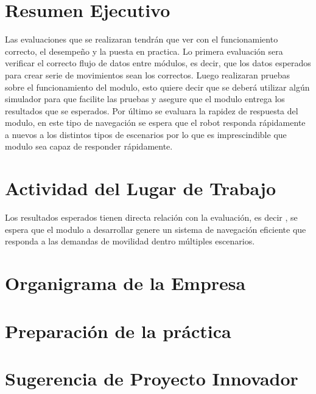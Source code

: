 \documentclass[11pt,twoside]{article}
\begin{document}
\section{Resumen Ejecutivo}

Las evaluaciones que se realizaran tendrán que ver con el funcionamiento correcto, el desempeño y la puesta en practica. Lo primera evaluación sera verificar el correcto flujo de datos entre módulos, es decir, que los datos esperados para crear serie de movimientos sean los correctos. Luego realizaran pruebas sobre el funcionamiento del modulo, esto quiere decir que se deberá utilizar algún simulador para que facilite las pruebas y asegure que el modulo entrega los resultados que se esperados. Por último se evaluara la rapidez de respuesta del modulo, en este tipo de navegación se espera que el robot responda rápidamente a nuevos a los distintos tipos de escenarios por lo que es imprescindible que modulo sea capaz de responder rápidamente.

\section{Actividad del Lugar de Trabajo}
Los resultados esperados tienen directa relación con la evaluación, es decir , se espera que el modulo a desarrollar genere un sistema de navegación eficiente que responda a las demandas de movilidad dentro múltiples escenarios.

\section{Organigrama de la Empresa}

\section{Preparaci\'on de la pr\'actica}

\section{Sugerencia de Proyecto Innovador}
\end{document}
